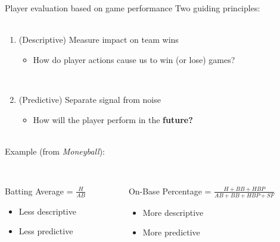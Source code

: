 \documentclass{beamer}
\begin{document}
\begin{frame}{Player evaluation based on game performance}
  Two guiding principles:\\
  ~
  \begin{enumerate}
    \item (Descriptive) Measure impact on team wins\\
    \begin{itemize}
      \item How do player actions cause us to win (or lose) games?
    \end{itemize}
    ~
    \item (Predictive) Separate signal from noise
    \begin{itemize}
      \item How will the player perform in the {\bf future?}
    \end{itemize}
  \end{enumerate}
  ~\\
  \pause
  Example (from {\it Moneyball}):\\
  ~\\
  \begin{columns}
    \begin{column}{0.35\textwidth}
      Batting Average = $\frac{H}{AB}$
      \begin{itemize}
        \item Less descriptive
        \item Less predictive
      \end{itemize}
    \end{column}
    \begin{column}{0.65\textwidth}
      On-Base Percentage = $\frac{H + BB + HBP}{AB + BB + HBP + SF}$
      \begin{itemize}
        \item More descriptive
        \item More predictive
      \end{itemize}
    \end{column}
  \end{columns}
\end{frame}
\end{document}
